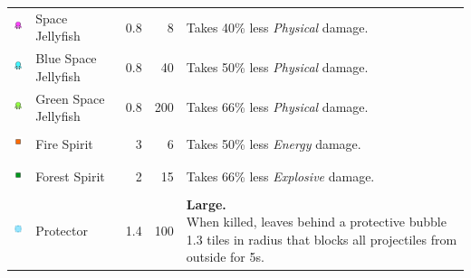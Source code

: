 \begin{table}[H]
\begin{tabular}{m{9mm}m{25mm}D{.}{.}{-1}rm{0.48\textwidth}}
        \includegraphics[height=7mm]{img/Icons/Attackers/Jellyfish.png}               & \footnotesize{Space Jellyfish}         & 0.8                 & 8                & \footnotesize{Takes 40\% less \emph{Physical} damage.}                                                                                                      \\
        \includegraphics[height=7mm]{img/Icons/Attackers/Blue Jellyfish.png}          & \footnotesize{Blue Space Jellyfish}    & 0.8                 & 40               & \footnotesize{Takes 50\% less \emph{Physical} damage.}                                                                                                      \\
        \includegraphics[height=7mm]{img/Icons/Attackers/Green Jellyfish.png}         & \footnotesize{Green Space Jellyfish}   & 0.8                 & 200              & \footnotesize{Takes 66\% less \emph{Physical} damage.}                                                                                                      \\
        \includegraphics[height=7mm]{img/Icons/Attackers/Fire Spirit.png}             & \footnotesize{Fire Spirit}             & 3                   & 6                & \footnotesize{Takes 50\% less \emph{Energy} damage.}                                                                                                        \\
        \includegraphics[height=7mm]{img/Icons/Attackers/Forest Spirit.png}           & \footnotesize{Forest Spirit}           & 2                   & 15               & \footnotesize{Takes 66\% less \emph{Explosive} damage.}                                                                                                     \\
        \includegraphics[height=7mm]{img/Icons/Attackers/Protector.png}               & \footnotesize{Protector}               & 1.4                 & 100              & \footnotesize{\textbf{Large.} \newline When killed, leaves behind a protective bubble 1.3 tiles in radius that blocks all projectiles from outside for 5s.} \\

\end{tabular}
\end{table}
